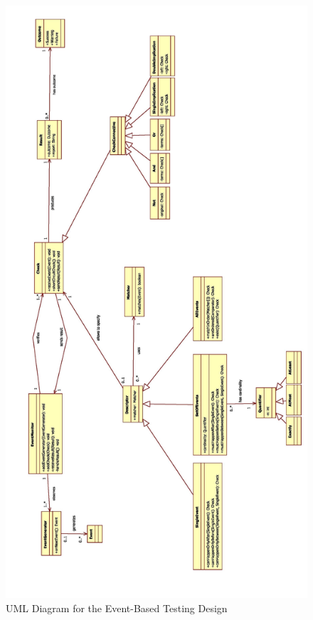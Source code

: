 \documentclass[11pt,a4paper,notitlepage]{article}
\begin{document}
\begin{figure}
  \centering
  \includegraphics[height=\textheight]{Images/Event/UML/Design.jpg}
  \caption[Event-Based Testing Design UML]{UML Diagram for the Event-Based Testing Design}
  \label{fig:event_uml_design}
\end{figure}
\end{document}
